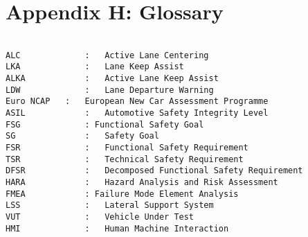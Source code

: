 
\chapter{Appendix H: Glossary} %

\label{AppendixH} %

\begin{lstlisting}

ALC				:	Active Lane Centering
LKA 			:	Lane Keep Assist
ALKA			:	Active Lane Keep Assist
LDW				:	Lane Departure Warning
Euro NCAP	:	European New Car Assessment Programme
ASIL			:	Automotive Safety Integrity Level
FSG				: Functional Safety Goal
SG				:	Safety Goal
FSR				:	Functional Safety Requirement
TSR				:	Technical Safety Requirement
DFSR			:	Decomposed Functional Safety Requirement
HARA			:	Hazard Analysis and Risk Assessment
FMEA			: Failure Mode Element Analysis
LSS				:	Lateral Support System
VUT				:	Vehicle Under Test
HMI				:	Human Machine Interaction


\end{lstlisting}

